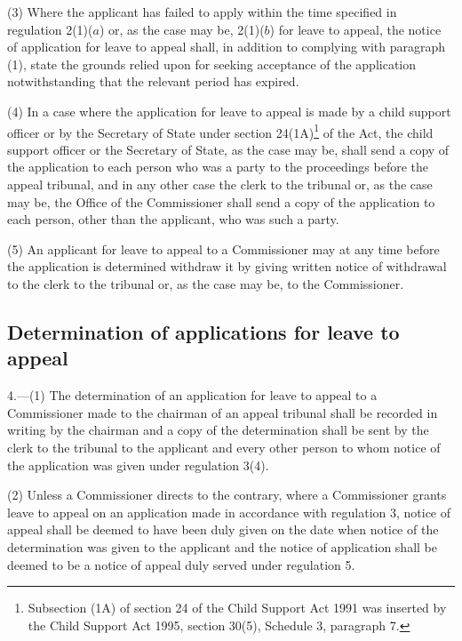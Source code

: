 \documentclass[12pt,a4paper]{article}
\begin{document}
(3) Where the applicant has failed to apply within the time specified in regulation 2(1)($a$) or, as the case may be, 2(1)($b$) for leave to appeal, the notice of application for leave to appeal shall, in addition to complying with paragraph (1), state the grounds relied upon for seeking acceptance of the application notwithstanding that the relevant period has expired.

(4) In a case where the application for leave to appeal is made by 
a child support officer or by the Secretary of State under section 24(1A)\footnote{\frenchspacing Subsection (1A) of section 24 of the Child Support Act 1991 was inserted by the Child Support Act 1995, section 30(5), Schedule 3, paragraph 7.} of the Act, the child support officer or the Secretary of State, as the case may be,  %
shall send a copy of the application to each person who was a party to the proceedings before the appeal tribunal, and in any other case the clerk to the tribunal or, as the case may be, the Office of the Commissioner shall send a copy of the application to each person, other than the applicant, who was such a party.

(5) An applicant for leave to appeal to a Commissioner may at any time before the application is determined withdraw it by giving written notice of withdrawal to the clerk to the tribunal or, as the case may be, to the Commissioner.


\subsection[4. Determination of applications for leave to appeal]{Determination of applications for leave to appeal}

4.—(1) The determination of an application for leave to appeal to a Commissioner made to the chairman of an appeal tribunal shall be recorded in writing by the chairman and a copy of the determination shall be sent by the clerk to the tribunal to the applicant and every other person to whom notice of the application was given under regulation 3(4).

(2) Unless a Commissioner directs to the contrary, where a Commissioner grants leave to appeal on an application made in accordance with regulation 3, notice of appeal shall be deemed to have been duly given on the date when notice of the determination was given to the applicant and the notice of application shall be deemed to be a notice of appeal duly served under regulation 5.
\end{document}
